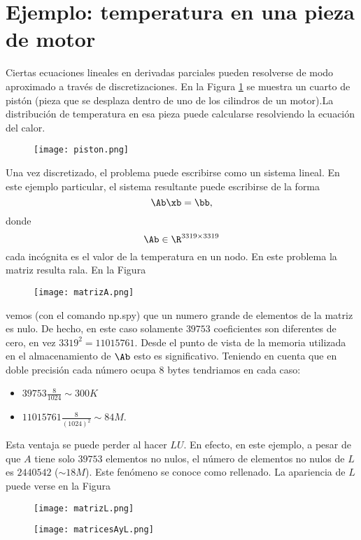 \section{Ejemplo: temperatura en una pieza de motor}
Ciertas ecuaciones lineales en derivadas parciales pueden resolverse de modo aproximado a través de discretizaciones. En la Figura \ref{fig:disc_piston} se muestra un cuarto de pistón (pieza que se desplaza dentro de uno de los cilindros de un motor).La distribución de temperatura en esa pieza puede calcularse resolviendo la ecuación del calor.
\begin{figure}[h]
\centering\texttt{[image: piston.png]}
\label{fig:disc_piston}
\end{figure}
Una vez discretizado, el problema puede escribirse como un sistema lineal. En este ejemplo particular, el sistema resultante  puede escribirse de la forma
 $$
 \Ab\xb=\bb,
 $$
 donde
 $$\Ab\in \R^{3319\times 3319}$$
cada incógnita es el valor de la temperatura en un nodo. En este problema la matriz resulta rala. En la Figura
\begin{figure}[h]
\centering\texttt{[image: matrizA.png]}
\label{fig:matrizA}
\end{figure}
vemos (con el comando np.spy) que un numero grande de elementos de la matriz es nulo. De hecho, en este caso solamente $39753$ coeficientes son diferentes de cero, en vez $3319^2=11015761$. Desde  el punto de vista de la memoria utilizada en el almacenamiento de $\Ab$ esto es significativo. Teniendo en cuenta que en doble precisión cada número ocupa 8 bytes tendriamos en cada caso:
\begin{itemize}
 \item $39753\frac{8}{1024}\sim 300K$
 \item $11015761 \frac{8}{(1024)^2}\sim 84M$.
\end{itemize}
Esta ventaja se puede perder al hacer $LU$.
En efecto, en este ejemplo, a pesar de que $A$ tiene solo $39753$ elementos no nulos, el número de elementos no nulos de $L$ es $2440542$ ($\sim 18M$). Este fenómeno se conoce como rellenado. La apariencia de $L$ puede verse en la Figura

\begin{figure}[h]
\centering\texttt{[image: matrizL.png]}
\end{figure}



\begin{figure}[h]
\centering\texttt{[image: matricesAyL.png]}
\end{figure}


